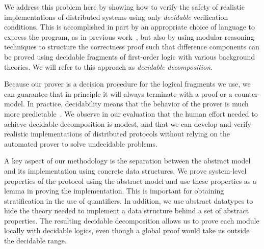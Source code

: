 We address this problem here by showing how to verify the safety of realistic
implementations of distributed systems using only \emph{decidable} verification
conditions. This is accomplished in part by an appropriate choice of
language to express the program, as in previous work~\cite{Ivy, dragoi_psync:_2016}, but also by using
modular reasoning techniques to structure the correctness proof such that
difference components can be proved using decidable fragments of first-order logic with various background theories.
We will refer to this approach as \emph{decidable decomposition}.


Because our prover is a decision procedure
for the logical fragments we use, we can guarantee that in principle
it will always terminate with a proof or a counter-model. In
practice, decidability means that the behavior of the prover is much
more predictable~\cite{oopsla17-epr}.
We observe in our evaluation that the
human effort needed to achieve %
decidable decomposition is modest, and that we
can develop and verify realistic implementations of distributed
protocols without relying on the automated prover to solve undecidable
problems.

A key aspect of our methodology is the separation between the abstract
model and its implementation using concrete data
structures. We prove system-level properties of the protocol using the
abstract model and use these properties as a lemma in proving the
implementation. This is important for obtaining stratification in the use of quantifiers.
In addition, we use abstract datatypes to hide the
theory needed to implement a data structure behind a set of abstract
properties. The resulting %
decidable decomposition allows us to prove each
module locally with decidable logics, even though a global proof would take us
outside the decidable range.


